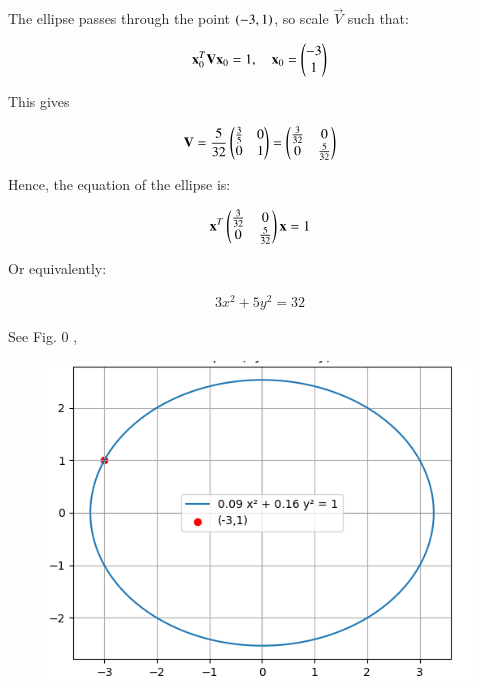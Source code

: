 \documentclass[journal]{IEEEtran}
\begin{document}
The ellipse passes through the point $\left(-3,1\right)$, so scale $\vec{V}$ such that:

\begin{align}
\mathbf{x}_0^T \mathbf{V} \mathbf{x}_0 = 1, \quad \mathbf{x}_0 = \begin{pmatrix}-3 \\ 1\end{pmatrix}
\end{align}

This gives

\begin{align}
\mathbf{V} = \frac{5}{32} \begin{pmatrix}\frac{3}{5} & 0 \\ 0 & 1\end{pmatrix} = \begin{pmatrix}\frac{3}{32} & 0 \\ 0 & \frac{5}{32}\end{pmatrix}
\end{align}

Hence, the equation of the ellipse is:

\begin{align}
\mathbf{x}^T \begin{pmatrix}\frac{3}{32} & 0 \\ 0 & \frac{5}{32}\end{pmatrix} \mathbf{x} = 1
\end{align}

Or equivalently:

\begin{align}
3 x^2 + 5 y^2 = 32
\end{align}


See Fig. 0 ,
\begin{figure}[H]
\begin{center}
\includegraphics[width=0.6\columnwidth]{figs/fig.png}
\end{center}
\caption{}
\label{fig:Fig1}
\end{figure}
\end{document}
